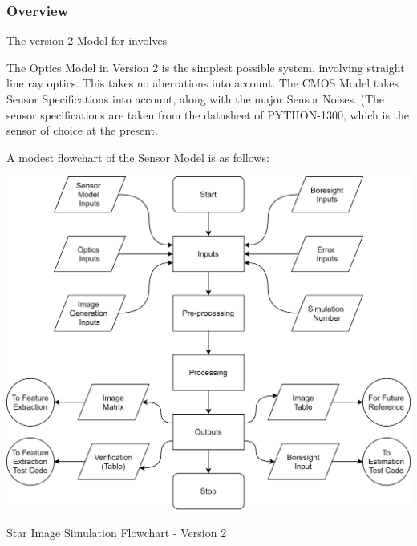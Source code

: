 \documentclass[../../main.tex]{subfiles}
\begin{document}



\subsubsection{Overview} %
The version 2 Model for \SIS involves -
\begin{enumerate}[label={}]
     The Optics Model in Version 2 is the simplest possible system, involving straight line ray optics. This takes no aberrations into account. 
     The CMOS Model takes Sensor Specifications into account, along with the major Sensor Noises. (The sensor specifications are taken from the datasheet of PYTHON-1300, which is the sensor of choice at the present. 
\end{enumerate}

A modest flowchart of the Sensor Model is as follows:

\begin{Flowchart}[h!]
    \centering
    \includegraphics[width=\textwidth]{Figures/Model/Sensor Model v2.png}
    \caption{Star Image Simulation Flowchart - Version 2}
    \label{fig:SIS_v2}
\end{Flowchart}
\end{document}
